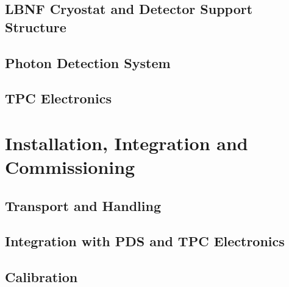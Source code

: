 



\subsection{LBNF Cryostat and Detector Support Structure}
\label{sec:fdsp-apa-intfc-lbnf-dss}


\subsection{Photon Detection System}
\label{sec:fdsp-apa-intfc-pds}


\subsection{TPC Electronics}
\label{sec:fdsp-apa-intfc-elec}




\section{Installation, Integration and Commissioning}
\label{sec:fdsp-apa-install}

\subsection{Transport and Handling}
\label{sec:fdsp-apa-install-transport}


\subsection{Integration with PDS and TPC Electronics}
\label{sec:fdsp-apa-install-pds-elec}


\subsection{Calibration}
\label{sec:fdsp-apa-install-calib}




